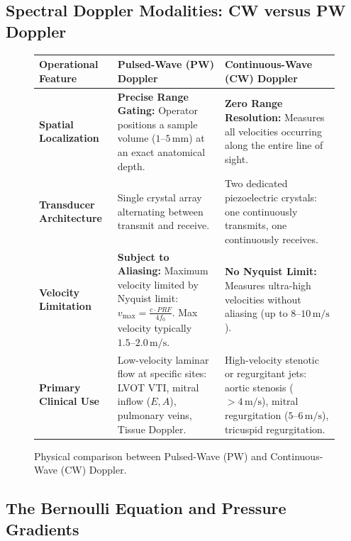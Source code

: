 \documentclass[11pt,a4paper]{article}
\begin{document}
\subsection{Spectral Doppler Modalities: CW versus PW Doppler}

\begin{figure}[htbp]
\centering
\setlength{\tabcolsep}{4pt}
\begin{tabular}{p{3.8cm}p{5.5cm}p{5.5cm}}
\toprule
\textbf{Operational Feature} & \textbf{Pulsed-Wave (PW) Doppler} & \textbf{Continuous-Wave (CW) Doppler} \\
\midrule
\textbf{Spatial Localization} & \textbf{Precise Range Gating:} Operator positions a sample volume ($1\text{--}5\,\text{mm}$) at an exact anatomical depth. & \textbf{Zero Range Resolution:} Measures all velocities occurring along the entire line of sight. \\
\addlinespace
\textbf{Transducer Architecture} & Single crystal array alternating between transmit and receive. & Two dedicated piezoelectric crystals: one continuously transmits, one continuously receives. \\
\addlinespace
\textbf{Velocity Limitation} & \textbf{Subject to Aliasing:} Maximum velocity limited by Nyquist limit: $v_{\text{max}} = \frac{c \cdot PRF}{4 f_0}$. Max velocity typically $1.5\text{--}2.0\,\text{m/s}$. & \textbf{No Nyquist Limit:} Measures ultra-high velocities without aliasing (up to $8\text{--}10\,\text{m/s}$). \\
\addlinespace
\textbf{Primary Clinical Use} & Low-velocity laminar flow at specific sites: LVOT VTI, mitral inflow ($E, A$), pulmonary veins, Tissue Doppler. & High-velocity stenotic or regurgitant jets: aortic stenosis ($> 4\,\text{m/s}$), mitral regurgitation ($5\text{--}6\,\text{m/s}$), tricuspid regurgitation. \\
\bottomrule
\end{tabular}
\caption{Physical comparison between Pulsed-Wave (PW) and Continuous-Wave (CW) Doppler.}
\label{tab:pw_cw}
\end{figure}

\subsection{The Bernoulli Equation and Pressure Gradients}
\end{document}
